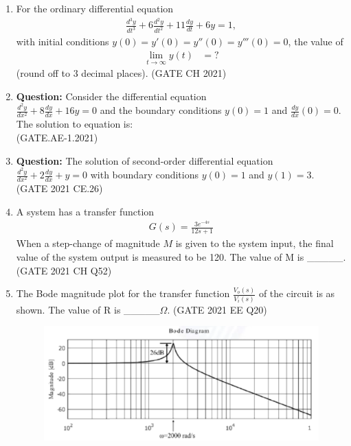 \begin{enumerate}[label=\thechapter.\arabic*,ref=\thechapter.\theenumi]
\item For the ordinary differential equation
\begin{align*}
\frac{d^3y}{dt^3} + 6\frac{d^2y}{dt^2} + 11\frac{dy}{dt} + 6y = 1,
\end{align*}
with initial conditions $y(0) = y'(0) = y''(0) = y'''(0) = 0$, the value of 
\begin{align*}
\lim_{{t \to \infty}} y(t) &= ?
\end{align*}
(round off to $3$ decimal places).
\hfill(GATE CH 2021)\\
\solution

\pagebreak
\item \textbf{Question:}
Consider the differential equation \\$\frac{d^2y}{dx^2}+8\frac{dy}{dx}+16y=0$ and the boundary conditions $y(0)=1$ and $\frac{dy}{dx}(0)=0$. The solution to equation is:\\
\hfill{(GATE.AE-1.2021)}\\
\solution

\pagebreak
\item\textbf{Question:}
The solution of second-order differential equation \\ $\frac{d^2y}{dx^2}+2\frac{dy}{dx}+y=0$ with boundary conditions $y(0)=1$ and $y(1)=3$.\\
\hfill{(GATE  2021 CE.26)}\\
\solution

\pagebreak
\item A system has a transfer function
\begin{align}
    G(s) = \frac{3e^{-4s}}{12s + 1}\nonumber
\end{align}
When a step-change of magnitude $M$ is given to the system input, the final value of the system output is measured to be 120. The value of M is \_\_\_\_\_.
\hfill(GATE 2021 CH Q52)\\
\solution

\pagebreak
\item The Bode magnitude plot for the transfer function $\frac{V_o(s)}{V_i(s)}$ of the circuit is as shown. The value of R is \_\_\_\_\_$\Omega$. \hfill(GATE 2021 EE Q20)
\begin{figure}[!ht]
    \centering
    
\end{figure}
\begin{figure}[!ht]
    \centering
    \includegraphics[width=\columnwidth]{2021/EE/20/figs/bode.png}

\end{figure}
\end{enumerate}

